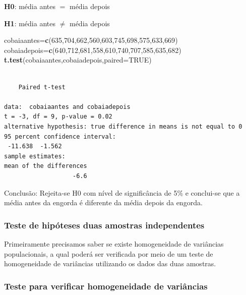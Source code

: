 \documentclass[12pt,portuguese,oneside]{book}
\newenvironment{Shaded}{\begin{snugshade}}{\end{snugshade}}
\newcommand{\KeywordTok}[1]{\textcolor[rgb]{0.13,0.29,0.53}{\textbf{#1}}}
\newcommand{\DataTypeTok}[1]{\textcolor[rgb]{0.13,0.29,0.53}{#1}}
\newcommand{\DecValTok}[1]{\textcolor[rgb]{0.00,0.00,0.81}{#1}}
\newcommand{\OtherTok}[1]{\textcolor[rgb]{0.56,0.35,0.01}{#1}}
\newcommand{\NormalTok}[1]{#1}
\begin{document}
\textbf{H0}: média antes \(=\) média depois

\textbf{H1}: média antes \(\neq\) média depois

\begin{Shaded}
\begin{Highlighting}[]
\NormalTok{cobaiaantes=}\KeywordTok{c}\NormalTok{(}\DecValTok{635}\NormalTok{,}\DecValTok{704}\NormalTok{,}\DecValTok{662}\NormalTok{,}\DecValTok{560}\NormalTok{,}\DecValTok{603}\NormalTok{,}\DecValTok{745}\NormalTok{,}\DecValTok{698}\NormalTok{,}\DecValTok{575}\NormalTok{,}\DecValTok{633}\NormalTok{,}\DecValTok{669}\NormalTok{)}
\NormalTok{cobaiadepois=}\KeywordTok{c}\NormalTok{(}\DecValTok{640}\NormalTok{,}\DecValTok{712}\NormalTok{,}\DecValTok{681}\NormalTok{,}\DecValTok{558}\NormalTok{,}\DecValTok{610}\NormalTok{,}\DecValTok{740}\NormalTok{,}\DecValTok{707}\NormalTok{,}\DecValTok{585}\NormalTok{,}\DecValTok{635}\NormalTok{,}\DecValTok{682}\NormalTok{)}
\KeywordTok{t.test}\NormalTok{(cobaiaantes,cobaiadepois,}\DataTypeTok{paired=}\OtherTok{TRUE}\NormalTok{)}
\end{Highlighting}
\end{Shaded}

\begin{verbatim}

    Paired t-test

data:  cobaiaantes and cobaiadepois
t = -3, df = 9, p-value = 0.02
alternative hypothesis: true difference in means is not equal to 0
95 percent confidence interval:
 -11.638  -1.562
sample estimates:
mean of the differences 
                   -6.6 
\end{verbatim}

Conclusão: Rejeita-se H0 com nível de significância de 5\% e conclui-se
que a média antes da engorda é diferente da média depois da engorda.

\subsubsection{Teste de hipóteses duas amostras
independentes}\label{teste-de-hipoteses-duas-amostras-independentes}

Primeiramente precisamos saber se existe homogeneidade de variâncias
populacionais, a qual poderá ser verificada por meio de um teste de
homogeneidade de variâncias utilizando os dados das duas amostras.

\subsubsection{Teste para verificar homogeneidade de
variâncias}\label{teste-para-verificar-homogeneidade-de-variancias}
\end{document}

